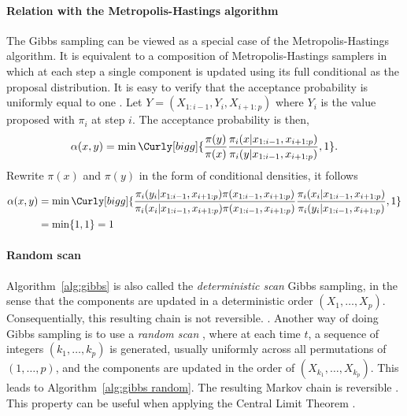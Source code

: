 \paragraph{Relation with the Metropolis-Hastings algorithm}

The Gibbs sampling can be viewed as a special case of the Metropolis-Hastings algorithm. It is equivalent to a composition of Metropolis-Hastings samplers in which at each step a single component is updated using its full conditional as the proposal distribution. It is easy to verify that the acceptance probability is uniformly equal to one \cite[][Theorem~10.13]{Robert:2004tn}. Let $Y = (X_{1:i-1},Y_i,X_{i+1:p})$ where $Y_i$ is the value proposed with $\pi_i$ at step $i$. The acceptance probability is then,
\begin{equation*}
  \alpha(x,y) = \min\Curly[bigg]{
    \frac{\pi(y)}{\pi(x)}
    \frac{\pi_i(x|x_{1:i-1},x_{i+1:p})}{\pi_i(y|x_{1:i-1},x_{i+1:p})},1}.
\end{equation*}
Rewrite $\pi(x)$ and $\pi(y)$ in the form of conditional densities, it follows
\begin{align*}
  \alpha(x,y) &= \min\Curly[bigg]{
    \frac{\pi_i(y_i|x_{1:i-1}, x_{i+1:p})\pi(x_{1:i-1},x_{i+1:p})}
    {\pi_i(x_i|x_{1:i-1}, x_{i+1:p})\pi(x_{1:i-1},x_{i+1:p})}
    \frac{\pi_i(x_i|x_{1:i-1}, x_{i+1:p})}{\pi_i(y_i|x_{1:i-1}, x_{i+1:p})},1}
    \\
  &= \min\{1,1\} = 1
\end{align*}

\paragraph{Random scan}

Algorithm~\ref{alg:gibbs} is also called the \emph{deterministic scan} Gibbs sampling, in the sense that the components are updated in a deterministic order $(X_1,\dots,X_p)$. Consequentially, this resulting chain is not reversible. . Another way of doing Gibbs sampling is to use a \emph{random scan} \cite{Liu1995Gibbs}, where at each time $t$, a sequence of integers $(k_1,\dots,k_p)$ is generated, usually uniformly across all permutations of $(1,\dots,p)$, and the components are updated in the order of $(X_{k_1},\dots,X_{k_p})$. This leads to Algorithm~\ref{alg:gibbs random}. The resulting Markov chain is reversible \cite{Liu1995Gibbs}. This property can be useful when applying the Central Limit Theorem \cite[][sec.~10.1.2]{Robert:2004tn}.

